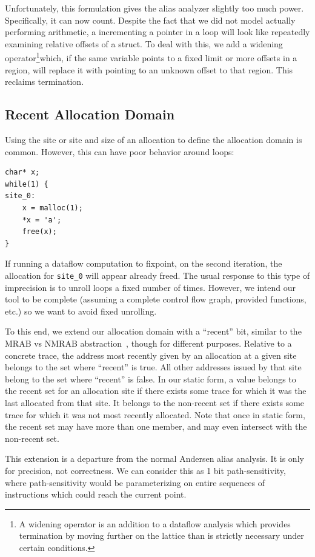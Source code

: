 Unfortunately, this formulation gives the alias analyzer slightly too much power.
Specifically, it can now count.
Despite the fact that we did not model actually performing arithmetic, a incrementing a pointer in a loop will look like repeatedly examining relative offsets of a struct.
To deal with this, we add a widening operator\footnote{
	A widening operator is an addition to a dataflow analysis which provides termination by moving further on the lattice than is strictly necessary under certain conditions.
}which, if the same variable points to a fixed limit or more offsets in a region, will replace it with pointing to an unknown offset to that region.
This reclaims termination.

\subsection{Recent Allocation Domain}
\label{sec:effects}
Using the site or site and size of an allocation to define the allocation domain is common.
However, this can have poor behavior around loops:

\begin{lstlisting}
char* x;
while(1) {
site_0:
	x = malloc(1);
	*x = 'a';
	free(x);
}
\end{lstlisting}

If running a dataflow computation to fixpoint, on the second
iteration, the allocation for \texttt{site\_0} will appear already
freed.  The usual response to this type of imprecision is to unroll
loops a fixed number of times.
However, we intend our tool to be complete (assuming a complete control flow graph, provided functions,
etc.) so we want to avoid fixed unrolling.

To this end, we extend our allocation domain with a ``recent'' bit, similar to the MRAB vs NMRAB abstraction~\cite{vsa}, though for different purposes.
Relative to a concrete trace, the address most recently given by an allocation at a given site belongs to the set where ``recent'' is true.
All other addresses issued by that site belong to the set where ``recent'' is false.
In our static form, a value belongs to the recent set for an allocation site if there exists some trace for which it was the last allocated from that site.
It belongs to the non-recent set if there exists some trace for which it was not most recently allocated.
Note that once in static form, the recent set may have more than one member, and may even intersect with the non-recent set.

This extension is a departure from the normal Andersen alias analysis.
It is only for precision, not correctness.
We can consider this as 1 bit path-sensitivity, where path-sensitivity would be parameterizing on entire sequences of instructions which could reach the current point.

